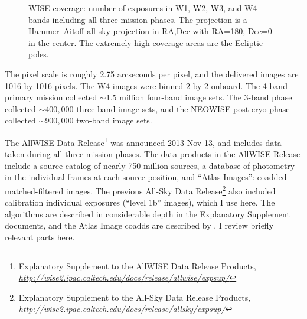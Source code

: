 \documentclass[11pt,preprint]{aastex}
\newcommand{\thou}{,\!000}
\newcommand{\niceurl}[1]{\href{#1}{\textsl{#1}}}
\newcommand{\bwfig}[1]{#1}
\begin{document}
%
%
\begin{figure}[t!]
\begin{center}
\newlength{\figw}
\setlength{\figw}{0.39\textwidth}
\begin{tabular}{@{}ccc@{}}
W1 & W2 &
} \\
\texttt{[image: \\bwfig\{plots6/cov-01]}} &
\texttt{[image: \\bwfig\{plots6/cov-02]}} &
\\
W3 & W4 & \\
\texttt{[image: \\bwfig\{plots6/cov-03]}} &
\texttt{[image: \\bwfig\{plots6/cov-04]}} &
\end{tabular}
\end{center}
\caption{WISE coverage: number of exposures in W1, W2, W3, and W4
  bands including all three mission phases.  The projection is a
  Hammer--Aitoff all-sky projection in RA,Dec with RA=180, Dec=0 in the
  center.  The extremely high-coverage areas are the Ecliptic poles.
  \label{fig:coverage}
}
\end{figure}


The pixel scale is roughly 2.75 arcseconds per pixel, and the
delivered images are 1016 by 1016 pixels.  The W4 images were binned
2-by-2 onboard.  The 4-band primary mission collected $\sim$1.5
million four-band image sets.  The 3-band phase collected
$\sim400\thou$ three-band image sets, and the NEOWISE post-cryo phase
collected $\sim900\thou$ two-band image sets.

The AllWISE Data Release\footnote{Explanatory Supplement to the
  AllWISE Data Release Products,
  \niceurl{http://wise2.ipac.caltech.edu/docs/release/allwise/expsup/}}
was announced 2013 Nov 13, and includes data taken during all three
mission phases.  The data products in the AllWISE Release include a
source catalog of nearly 750 million sources, a database of photometry
in the individual frames at each source position, and ``Atlas
Images'': coadded matched-filtered images.  The previous All-Sky Data
Release\footnote{Explanatory Supplement to the All-Sky Data Release
  Products,
  \niceurl{http://wise2.ipac.caltech.edu/docs/release/allsky/expsup/}}
also included calibration individual exposures (``level 1b'' images),
which I use here.  The algorithms are described in considerable depth
in the Explanatory Supplement documents, and the Atlas Image coadds
are described by \cite{awaic}.  I review briefly relevant parts here.
\end{document}
